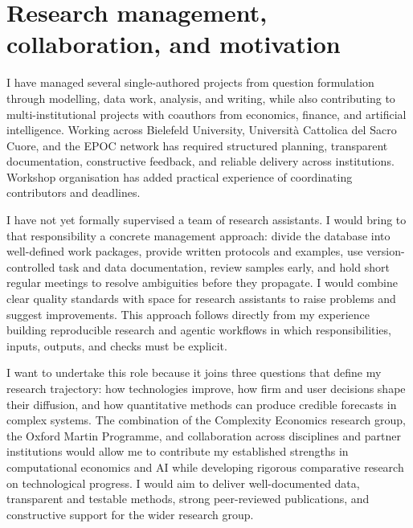 \documentclass{nfr}
\begin{document}
\section*{Research management, collaboration, and motivation}

I have managed several single-authored projects from question formulation through modelling, data work, analysis, and writing, while also contributing to multi-institutional projects with coauthors from economics, finance, and artificial intelligence. Working across Bielefeld University, Universit\`a Cattolica del Sacro Cuore, and the EPOC network has required structured planning, transparent documentation, constructive feedback, and reliable delivery across institutions. Workshop organisation has added practical experience of coordinating contributors and deadlines.

I have not yet formally supervised a team of research assistants. I would bring to that responsibility a concrete management approach: divide the database into well-defined work packages, provide written protocols and examples, use version-controlled task and data documentation, review samples early, and hold short regular meetings to resolve ambiguities before they propagate. I would combine clear quality standards with space for research assistants to raise problems and suggest improvements. This approach follows directly from my experience building reproducible research and agentic workflows in which responsibilities, inputs, outputs, and checks must be explicit.

I want to undertake this role because it joins three questions that define my research trajectory: how technologies improve, how firm and user decisions shape their diffusion, and how quantitative methods can produce credible forecasts in complex systems. The combination of the Complexity Economics research group, the Oxford Martin Programme, and collaboration across disciplines and partner institutions would allow me to contribute my established strengths in computational economics and AI while developing rigorous comparative research on technological progress. I would aim to deliver well-documented data, transparent and testable methods, strong peer-reviewed publications, and constructive support for the wider research group.
\end{document}

